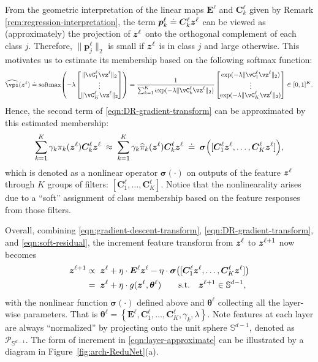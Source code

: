 \documentclass[../../book-main.tex]{subfiles}
\begin{document}
From the geometric interpretation of the linear maps $\bm E^\ell$ and $\bm C_k^\ell$ given by Remark \ref{rem:regression-interpretation}, the term $\bm p_{k}^{\ell} \doteq \bm C^{\ell}_k \bm{z}^{\ell}$ can be viewed as (approximately) the projection of $\bm{z}^{\ell}$ onto the orthogonal complement of each class $j$. Therefore, $\|\bm p_{j}^{\ell}\|_2$ is small if $\bm{z}^\ell$ is in class $j$ and large otherwise. This motivates us to estimate its membership based on the following softmax function:
\begin{equation}
    \widehat{\vpi}(\z^\ell) \doteq \softmax\rp{-\lambda\mat{\norm{\vC^{\ell}_{1}\vz^{\ell}}_{2} \\ \vdots \\ \norm{\vC^{\ell}_{K}\vz^{\ell}}_{2}}} = \frac{1}{\sum_{k = 1}^{K}\exp(-\lambda \norm{\vC^{\ell}_{k}\vz^{\ell}}_{2})}\mat{\exp(-\lambda\norm{\vC^{\ell}_{1}\vz^{\ell}}_{2}) \\ \vdots \\ \exp(-\lambda\norm{\vC^{\ell}_{K}\vz^{\ell}}_{2})} \in [0,1]^{K}.
\end{equation}
Hence, the second term of \eqref{eqn:DR-gradient-transform} can be approximated by this estimated membership:
\begin{align}
\sum_{k=1}^K \gamma_{k} \pi_k(\bm{z}^\ell)\bm C_{k}^{\ell}  \bm{z}^{\ell} 
\; \approx \;  \sum_{k=1}^K \gamma_{k} \widehat{\pi}_k(\bm{z}^\ell)  \bm{C}^{\ell}_k  \bm{z}^{\ell} 
\; \doteq \; \bm \sigma\Big([\bm{C}^{\ell}_{1} \bm{z}^{\ell}, \dots, \bm{C}^{\ell}_{K} \bm{z}^{\ell}]\Big),
\label{eqn:soft-residual}
\end{align}
which is denoted as a nonlinear operator $\bm \sigma(\cdot)$ on outputs of the feature $\bm{z}^\ell$ through $K$ groups of filters: $[\bm{C}^{\ell}_{1}, \dots, \bm{C}^{\ell}_{K}]$. Notice that the nonlinearality arises due to a ``soft'' assignment of class membership based on the feature responses from those filters.  

Overall, combining \eqref{eqn:gradient-descent-transform},  \eqref{eqn:DR-gradient-transform}, and \eqref{eqn:soft-residual}, 
the increment feature transform from $\bm{z}^{\ell}$ to $\bm{z}^{\ell+1}$ now becomes
\begin{equation}\label{eqn:layer-approximate}
\begin{aligned}
\bm{z}^{\ell+1}  &\propto \; \bm{z}^\ell +  \eta \cdot  \bm E^{\ell} \bm{z}^{\ell} - \eta\cdot  \bm \sigma\big([\bm{C}^{\ell}_{1} \bm{z}^{\ell}, \dots, \bm{C}^{\ell}_{K} \bm{z}^{\ell}]\big)  \\
&= \; \bm{z}^\ell +  \eta \cdot g(\bm{z}^\ell, \bm \theta^\ell) \qquad \mbox{s.t.} \quad \bm{z}^{\ell +1} \in \mathbb{S}^{d-1},
\end{aligned}
\end{equation}
with the nonlinear function $\bm \sigma(\cdot)$ defined above and $\bm \theta^\ell$ collecting all the layer-wise parameters. That is  $\bm \theta^\ell =\left\{\bm E^\ell, \bm{C}^{\ell}_{1}, \dots, \bm{C}^{\ell}_{K}, \gamma_{k}, \lambda\right\}$. Note features at each layer are always ``normalized'' by projecting onto the unit sphere $\mathbb S^{d-1}$, denoted as $\mathcal P_{\mathbb S^{d-1}}$. The form of increment in \eqref{eqn:layer-approximate} can be illustrated by a diagram in  Figure~\ref{fig:arch-ReduNet}(a).
\end{document}
